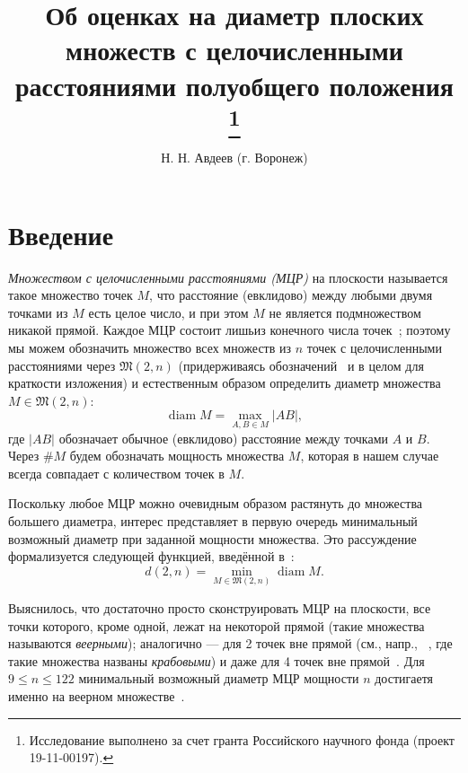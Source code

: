 \documentclass[11pt,twoside,draft
]{article}
\title
{%
Об оценках на диаметр плоских множеств с целочисленными расстояниями полуобщего положения%
\footnote{Исследование выполнено за счет гранта Российского научного фонда (проект 19-11-00197).}}
{%
On diameter bounds for planar integral point sets in semi-general position}
\author
{%
Н. Н. Авдеев (г. Воронеж)}
{%
N. N. Avdeev (Voronezh)}
\begin{document}
\maketitle

\enmaketitle



\section{Введение}



\textit{Множеством с целочисленными расстояниями (МЦР)} на плоскости
называется такое множество точек $M$, что расстояние (евклидово) между любыми двумя точками из $M$
есть целое число, и при этом $M$ не является подмножеством никакой прямой.
Каждое МЦР состоит лишьиз конечного числа точек~\cite{anning1945integral,erdos1945integral};
поэтому мы можем обозначить множество всех множеств из $n$ точек с целочисленными расстояниями через
$\mathfrak{M}(2,n)$ (придерживаясь обозначений~\cite{our-vmmsh-2018} и в целом для краткости изложения)
и естественным образом определить диаметр множества $M\in\mathfrak{M}(2,n)$:
\begin{equation}
	\operatorname{diam} M = \max_{A,B\in M} |AB|
	,
\end{equation}
где $|AB|$ обозначает обычное (евклидово) расстояние между точками $A$ и $B$.
Через $\# M$ будем обозначать мощность множества $M$, которая в нашем случае всегда совпадает с количеством точек в $M$.

Поскольку любое МЦР можно очевидным образом растянуть
до множества большего диаметра,
интерес представляет в первую очередь минимальный возможный диаметр при заданной мощности множества.
Это рассуждение формализуется следующей функцией, введённой в~\cite{kurz2008bounds,kurz2008minimum}:
\begin{equation}
	d(2,n) = \min_{M\in\mathfrak{M}(2,n)} \operatorname{diam} M
	.
\end{equation}

Выяснилось, что достаточно просто сконструировать МЦР на плоскости,
все точки которого, кроме одной, лежат на некоторой прямой
(такие множества называются \textit{веерными});
аналогично --- для 2 точек вне прямой (см., напр., ~\cite{antonov2008maximal}, где такие множества названы \textit{крабовыми})
и даже для 4 точек вне прямой~\cite{huff1948diophantine}.
Для $9\leq n\leq 122$ минимальный возможный диаметр МЦР мощности $n$ достигаетя именно на веерном множестве~\cite{kurz2008bounds}.
\end{document}
